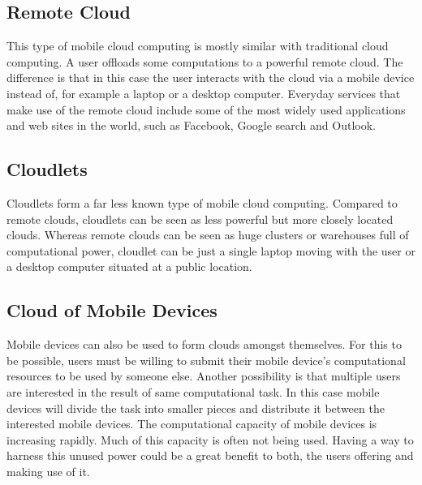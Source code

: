 \documentclass[conference]{IEEEtran}
\begin{document}
\subsection{Remote Cloud}
This type of mobile cloud computing is mostly similar with traditional cloud computing. A user offloads some computations to a powerful remote cloud. The difference is that in this case the user interacts with the cloud via a mobile device instead of, for example a laptop or a desktop computer. Everyday services that make use of the remote cloud include some of the most widely used applications and web sites in the world, such as Facebook, Google search and Outlook.

\subsection{Cloudlets}
Cloudlets form a far less known type of mobile cloud computing. Compared to remote clouds, cloudlets can be seen as less powerful but more closely located clouds. Whereas remote clouds can be seen as huge clusters or warehouses full of computational power, cloudlet can be just a single laptop moving with the user or a desktop computer situated at a public location.

\subsection{Cloud of Mobile Devices}
Mobile devices can also be used to form clouds amongst themselves. For this to be possible, users must be willing to submit their mobile device's computational resources to be used by someone else. Another possibility is that multiple users are interested in the result of same computational task. In this case mobile devices will divide the task into smaller pieces and distribute it between the interested mobile devices. The computational capacity of mobile devices is increasing rapidly. Much of this capacity is often not being used. Having a way to harness this unused power could be a great benefit to both, the users offering and making use of it.\\
\end{document}
